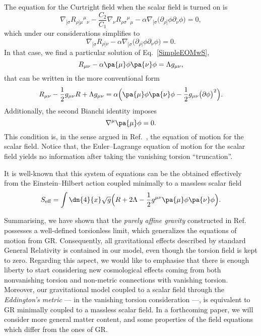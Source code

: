 \documentclass[aps,prl,twocolumn,superscriptaddress,showpacs,showkeys]{revtex4-1}
\begin{document}
The equation for the Curtright field when the scalar field is turned on is
\begin{equation*}
  \nabla_{[\sigma} R_{\rho]\mu}{}^{\mu}{}_\nu - \frac{C_2}{C_1} \nabla_\nu  R_{\rho\sigma}{}^{\mu}{}_\mu - \alpha \nabla_{[\sigma} \Big( \partial_{\rho]}\phi \partial_\nu\phi \Big) = 0,
\end{equation*}
which under our considerations simplifies to 
\begin{equation}
  \nabla_{[\sigma} R_{\rho]\nu} - \alpha \nabla_{[\sigma} \Big( \partial_{\rho]}\phi \partial_\nu\phi \Big) = 0.
  \label{SimpleEOMwS}
\end{equation}
In that case, we find a particular solution of Eq.~\eqref{SimpleEOMwS},%
\begin{equation*}
  R_{\mu\nu} - \alpha \pa{\mu} \phi \pa{\nu} \phi = \Lambda g_{\mu\nu},
\end{equation*}
that can be written in the more conventional form
\begin{equation}
  R_{\mu\nu} - \frac{1}{2} g_{\mu\nu} R + \Lambda g_{\mu\nu} = \alpha \Big( \pa{\mu} \phi \pa{\nu} \phi - \frac{1}{2} g_{\mu\nu} \big( \partial\phi \big)^2 \Big).
\end{equation}
Additionally, the second Bianchi identity imposes
\begin{equation}
  \nabla^\mu \pa{\mu} \phi = 0.
\end{equation}
This condition is, in the sense argued in Ref.~\cite{Bekenstein:2014uwa}, the equation of motion for the scalar field. Notice that, the Euler--Lagrange equation of motion for the scalar field yields no information after taking the vanishing torsion ``truncation''.

It is well-known that this system of equations can be the obtained effectively from the Einstein--Hilbert action coupled minimally to a massless scalar field
\begin{equation}
  S_{\text{eff}} = \int \dn{4}{x} \sqrt{g} \Big( R + 2 \Lambda - \frac{1}{2} g^{\mu\nu} \pa{\mu}\phi \pa{\nu} \phi \Big).
\end{equation}

Summarising, we have shown that the  \emph{purely affine gravity} constructed in Ref.~\cite{Skirzewski:2014eta} possesses a well-defined torsionless limit, which generalizes the equations of motion  from GR. Consequently, all gravitational effects described by standard General Relativity is contained in our model, even though the torsion field is kept to zero. Regarding this aspect, we would like to emphasise that there is enough liberty to start considering new cosmological effects coming from both nonvanishing torsion and non-metric connections with vanishing torsion.
Moreover, our gravitational model coupled to a scalar field through the \emph{Eddington's metric} --- in the vanishing torsion consideration ---, is equivalent to GR minimally coupled to a massless scalar field. In a forthcoming paper, we will consider more general matter content, and some properties of the field equations which differ from the ones of GR.%
\end{document}
